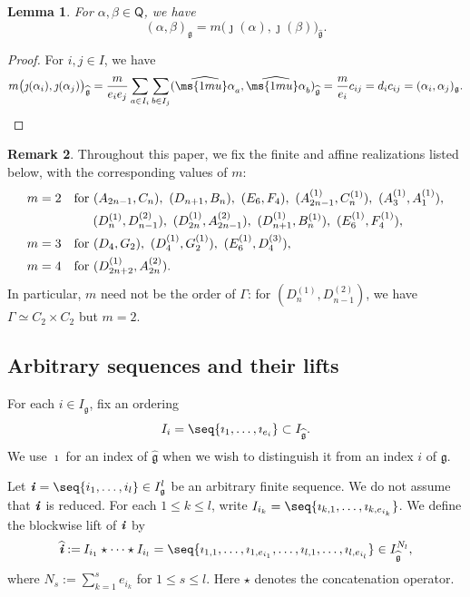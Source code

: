 \documentclass[12pt, leqno]{amsart}
\numberwithin{equation}{section}
\theoremstyle{plain}
\newtheorem{lemma}{Lemma}[section]
\theoremstyle{definition}
\newtheorem{remark}[lemma]{Remark}
\renewcommand{\le}{\leqslant}
\newcommand{\seteq}{\mathbin{:=}}
\newcommand{\g}{\mathfrak{g}}
\newcommand{\al}{{\ms{1mu}\alpha}}
\newcommand{\im}{\imath}
\newcommand{\jm}{\jmath}
\newcommand{\ii}{ \textbf{\textit{i}}}
\newcommand{\hg}{{\widehat{\g}}}
\newcommand{\hal}{\widehat{\al}}
\newcommand{\hii}{{\widehat{\ii}}}
\newcommand{\sfQ}{\mathsf{Q}}
\begin{document}
\begin{lemma}\label{lem: form scaling}
For $\alpha,\beta\in\sfQ$, we have
\[
(\alpha,\beta)_\g = m\bigl(\jm(\alpha),\jm(\beta)\bigr)_\hg.
\]
\end{lemma}

\begin{proof}
For $i,j\in I$, we have
\[
m\bigl(\jm(\alpha_i),\jm(\alpha_j)\bigr)_\hg
= \frac{m}{e_i e_j} \sum_{a\in I_i}\sum_{b\in I_j} (\hal_a,\hal_b)_\hg
= \frac{m}{e_i}c_{ij} = d_i c_{ij} = (\alpha_i,\alpha_j)_\g. \qedhere
\]
\end{proof}

\begin{remark}
Throughout this paper, we fix the finite and affine realizations listed below, with the corresponding values of \(m\): 
\[
\begin{aligned}
m=2 \quad &\text{for }
(A_{2n-1},C_n),\ (D_{n+1},B_n),\ (E_6,F_4), \ (A_{2n-1}^{(1)},C_n^{(1)}), \   (A_{3}^{(1)},A_1^{(1)}),  \allowdisplaybreaks\\
&  \hspace{1.5em}  (D_n^{(1)},D_{n-1}^{(2)}),\ (D_{2n}^{(1)},A_{2n-1}^{(2)}),\   (D_{n+1}^{(1)},B_n^{(1)}),\  (E_6^{(1)},F_4^{(1)}),\allowdisplaybreaks\\
m=3 \quad &\text{for } (D_4,G_2),\ (D_4^{(1)},G_2^{(1)}),\ (E_6^{(1)},D_4^{(3)}),\allowdisplaybreaks\\
m=4 \quad &\text{for } (D_{2n+2}^{(1)},A_{2n}^{(2)}).
\end{aligned}
\]
In particular, $m$ need not be the order of $\Gamma$:
for $(D_n^{(1)},D_{n-1}^{(2)})$, we have
$\Gamma\simeq C_2\times C_2$ but $m=2$.
\end{remark}

\subsection{Arbitrary sequences and their lifts} \label{subsec: seq lift}

For each $i\in I_\g$, fix an ordering
\[
I_i=\seq{\im_1,\ldots,\im_{e_i}} \subset I_\hg.
\]
We use $\im$ for an index of $\hg$ when we wish to distinguish it
from an index $i$ of $\g$.

Let $\ii=\seq{i_1,\ldots,i_l}\in I^l_\g$
be an arbitrary finite sequence. We do not assume that $\ii$ is reduced.
For each $1\le k\le l$, write $I_{i_k}=\seq{\im_{k,1},\ldots,\im_{k,e_{i_k}}}$.
We define the blockwise lift of $\ii$ by
\begin{align} \label{eq: hii}
\hii \seteq I_{i_1}\star\cdots\star I_{i_l} = \seq{\im_{1,1},\ldots,\im_{1,e_{i_1}},\ldots, \im_{l,1},\ldots,\im_{l,e_{i_l}}}
\in I_\hg^{N_l},
\end{align}
where $N_s \seteq \sum_{k=1}^{s}e_{i_k}$ for $1 \le s \le l$. Here $\star$ denotes the concatenation operator.
\end{document}
